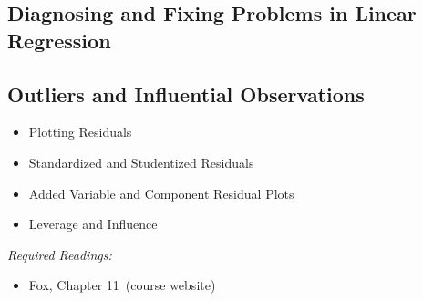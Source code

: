 \documentclass[PS]{syllabus}
\newif\ifrelease
\newcommand{\onsite}{\ifrelease\else\ (course website)\fi}
\begin{document}
\begin{syllabus}




\section{Diagnosing and Fixing Problems in Linear Regression}
\subsection{Outliers and Influential Observations}
	\begin{itemize}
	\item Plotting Residuals
	\item Standardized and Studentized Residuals
	\item Added Variable and Component Residual Plots
	\item Leverage and Influence
\end{itemize}
\textit{Required Readings:}
	\begin{itemize}
  \item Fox, Chapter 11\onsite
\end{itemize}
	

\end{syllabus}
\end{document}
